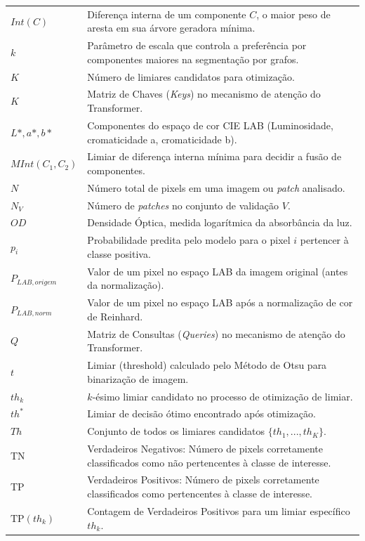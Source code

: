 \begin{longtable}{p{2.5cm} p{12.5cm}}
    $Int(C)$ & Diferença interna de um componente $C$, o maior peso de aresta em sua árvore geradora mínima. \\
    $k$       & Parâmetro de escala que controla a preferência por componentes maiores na segmentação por grafos. \\
    $K$       & Número de limiares candidatos para otimização. \\
    $K$       & Matriz de Chaves (\textit{Keys}) no mecanismo de atenção do Transformer. \\
    $L*, a*, b*$ & Componentes do espaço de cor CIE LAB (Luminosidade, cromaticidade a, cromaticidade b). \\
    $MInt(C_1, C_2)$ & Limiar de diferença interna mínima para decidir a fusão de componentes. \\
    $N$       & Número total de pixels em uma imagem ou \textit{patch} analisado. \\
    $N_V$     & Número de \textit{patches} no conjunto de validação $V$. \\
    $OD$      & Densidade Óptica, medida logarítmica da absorbância da luz. \\
    $p_i$     & Probabilidade predita pelo modelo para o pixel $i$ pertencer à classe positiva. \\
    $P_{LAB, origem}$ & Valor de um pixel no espaço LAB da imagem original (antes da normalização). \\
    $P_{LAB, norm}$ & Valor de um pixel no espaço LAB após a normalização de cor de Reinhard. \\
    $Q$       & Matriz de Consultas (\textit{Queries}) no mecanismo de atenção do Transformer. \\
    $t$       & Limiar (threshold) calculado pelo Método de Otsu para binarização de imagem. \\
    $th_k$    & $k$-ésimo limiar candidato no processo de otimização de limiar. \\
    $th^*$    & Limiar de decisão ótimo encontrado após otimização. \\
    $Th$      & Conjunto de todos os limiares candidatos $\{th_1, ..., th_K\}$. \\
    TN        & Verdadeiros Negativos: Número de pixels corretamente classificados como não pertencentes à classe de interesse. \\
    TP        & Verdadeiros Positivos: Número de pixels corretamente classificados como pertencentes à classe de interesse. \\
    $\text{TP}(th_k)$ & Contagem de Verdadeiros Positivos para um limiar específico $th_k$. \\

\end{longtable}
